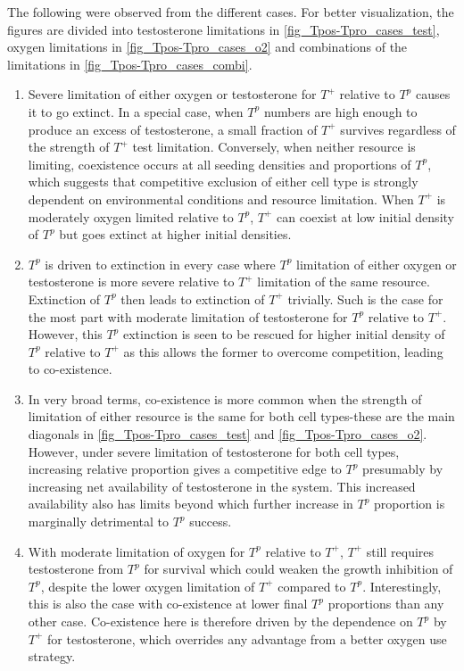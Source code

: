 The following were observed from the different cases. For better visualization, the figures are divided into testosterone limitations in \autoref{fig_Tpos-Tpro_cases_test}, oxygen limitations in \autoref{fig_Tpos-Tpro_cases_o2} and combinations of the limitations in \autoref{fig_Tpos-Tpro_cases_combi}.
\begin{enumerate}
  \item Severe limitation of either oxygen or testosterone for $T^+$ relative to $T^p$ causes it to go extinct. In a special case, when $T^p$ numbers are high enough to produce an excess of testosterone, a small fraction of $T^+$ survives regardless of the strength of $T^+$ test limitation. Conversely, when neither resource is limiting, coexistence occurs at all seeding densities and proportions of $T^p$, which suggests that competitive exclusion of either cell type is strongly dependent on environmental conditions and resource limitation. When $T^+$ is moderately oxygen limited relative to $T^p$, $T^+$ can coexist at low initial density of $T^p$ but goes extinct at higher initial densities.
  \item $T^p$ is driven to extinction in every case where $T^p$ limitation of either oxygen or testosterone is more severe relative to $T^+$ limitation of the same resource. Extinction of $T^p$ then leads to extinction of $T^+$ trivially. Such is the case for the most part with moderate limitation of testosterone for $T^p$ relative to $T^+$. However, this $T^p$ extinction is seen to be rescued for higher initial density of $T^p$ relative to $T^+$ as this allows the former to overcome competition, leading to co-existence.
  \item In very broad terms, co-existence is more common when the strength of limitation of either resource is the same for both cell types-these are the main diagonals in \autoref{fig_Tpos-Tpro_cases_test} and \autoref{fig_Tpos-Tpro_cases_o2}. However, under severe limitation of testosterone for both cell types, increasing relative proportion gives a competitive edge to $T^p$ presumably by increasing net availability of testosterone in the system. This increased availability also has limits beyond which further increase in $T^p$ proportion is marginally detrimental to $T^p$ success.
  \item With moderate limitation of oxygen for $T^p$ relative to $T^+$, $T^+$ still requires testosterone from $T^p$ for survival which could weaken the growth inhibition of $T^p$, despite the lower oxygen limitation of $T^+$ compared to $T^p$. Interestingly, this is also the case with co-existence at lower final $T^p$ proportions than any other case. Co-existence here is therefore driven by the dependence on $T^p$ by $T^+$ for testosterone, which overrides any advantage from a better oxygen use strategy.

\end{enumerate}
